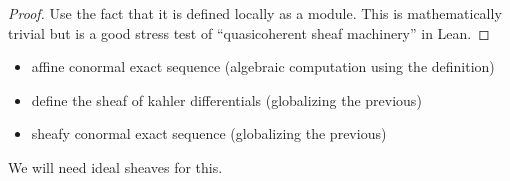 \begin{proof}
	Use the fact that it is defined locally
	as a module.
	This is mathematically trivial but 
	is a good stress test of 
	``quasicoherent sheaf machinery''
	in Lean.
\end{proof}

\begin{itemize}
    \item affine conormal exact sequence
		(algebraic computation using the definition)
	\item define the sheaf of kahler differentials
		(globalizing the previous)
	\item sheafy conormal exact sequence
		(globalizing the previous)
\end{itemize}


We will need ideal sheaves for this.




%
%
%
%
%
%
%
%
%
%
%
%

